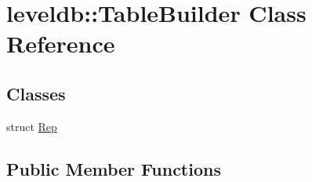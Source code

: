 \hypertarget{classleveldb_1_1_table_builder}{}\section{leveldb\+::Table\+Builder Class Reference}
\label{classleveldb_1_1_table_builder}
\subsection*{Classes}
\begin{DoxyCompactItemize}
\item 
struct \mbox{\hyperlink{structleveldb_1_1_table_builder_1_1_rep}{Rep}}
\end{DoxyCompactItemize}
\subsection*{Public Member Functions}
